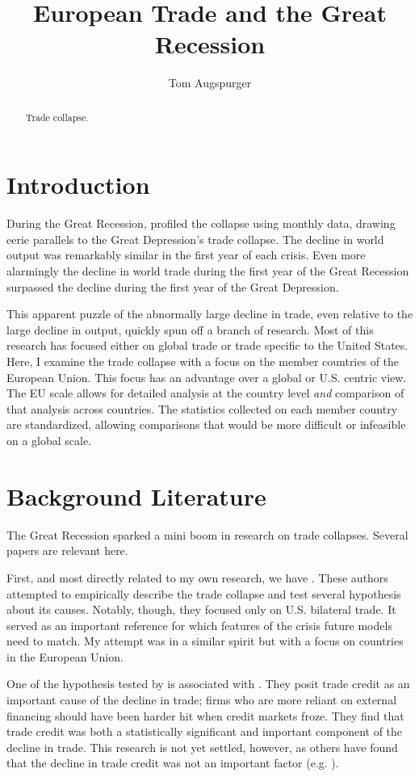\documentclass[11pt]{article}
\title{European Trade and the Great Recession}
\author{Tom Augspurger}
\date{}
\begin{document}
\maketitle
\begin{abstract}
  Trade collapse.
\end{abstract}
\section{Introduction}
\label{sec:introduction}

  During the Great Recession, \cite{eichengreen_orourke:2010} profiled the collapse using monthly data, drawing eerie parallels to the Great Depression's trade collapse.  The decline in world output was remarkably similar in the first year of each crisis.  Even more alarmingly the decline in world trade during the first year of the Great Recession surpassed the decline during the first year of the Great Depression.

  This apparent puzzle of the abnormally large decline in trade, even relative to the large decline in output, quickly spun off a branch of research.  Most of this research has focused either on global trade or trade specific to the United States.  Here, I examine the trade collapse with a focus on the member countries of the European Union.  This focus has an advantage over a global or U.S. centric view.  The EU scale allows for detailed analysis at the country level \emph{and} comparison of that analysis across countries. The statistics collected on each member country are standardized, allowing comparisons that would be more difficult or infeasible on a global scale.

\section{Background Literature}
\label{sec:background_literature}
  The Great Recession sparked a mini boom in research on trade collapses.  Several papers are relevant here. 

  First, and most directly related to my own research, we have \cite{llt:2010}.  These authors attempted to empirically describe the trade collapse and test several hypothesis about its causes.  Notably, though, they focused only on U.S. bilateral trade.  It served as an important reference for which features of the crisis future models need to match.  My attempt was in a similar spirit but with a focus on countries in the European Union.

  One of the hypothesis tested by \cite{llt:2010} is associated with \cite{chor-manova:2012}. They posit trade credit as an important cause of the decline in trade; firms who are more reliant on external financing should have been harder hit when credit markets froze.  They find that trade credit was both a statistically significant and important component of the decline in trade.  This research is not yet settled, however, as others have found that the decline in trade credit was not an important factor (e.g. \cite{RePEc:imf:imfwpa:11/16}).
\end{document}
